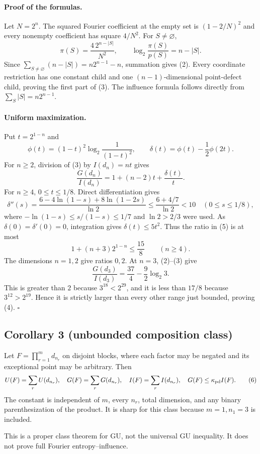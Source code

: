 \paragraph{Proof of the formulas.}
Let $N=2^n$.  The squared Fourier coefficient at the empty set is
$(1-2/N)^2$ and every nonempty coefficient has square $4/N^2$.  For
$S\ne\varnothing$,
\[
 \pi(S)=\frac{4\,2^{n-|S|}}{N^2},
 \qquad \log_2\frac{\pi(S)}{p(S)}=n-|S|.
\]
Since
$\sum_{S\ne\varnothing}(n-|S|)=n2^{n-1}-n$, summation gives (2).
Every coordinate restriction has one constant child and one
$(n-1)$-dimensional point-defect child, proving the first part of (3).
The influence formula follows directly from
$\sum_S|S|=n2^{n-1}$.

\paragraph{Uniform maximization.}
Put $t=2^{1-n}$ and
\[
 \phi(t)=(1-t)^2\log_2\frac1{(1-t)^2},\qquad
 \delta(t)=\phi(t)-\frac12\phi(2t).
\]
For $n\ge2$, division of (3) by $I(d_n)=nt$ gives
\[
 \frac{G(d_n)}{I(d_n)}
 =1+(n-2)t+\frac{\delta(t)}t.
\tag{5}
\]
For $n\ge4$, $0\le t\le1/8$.  Direct differentiation gives
\[
 \delta''(s)=\frac{6-4\ln(1-s)+8\ln(1-2s)}{\ln2}
 \le\frac{6+4/7}{\ln2}<10
 \quad(0\le s\le1/8),
\]
where $-\ln(1-s)\le s/(1-s)\le1/7$ and $\ln2>2/3$ were used.
As $\delta(0)=\delta'(0)=0$, integration gives $\delta(t)\le5t^2$.
Thus the ratio in (5) is at most
\[
 1+(n+3)2^{1-n}\le\frac{15}{8}\qquad(n\ge4).
\]
The dimensions $n=1,2$ give ratios $0,2$.  At $n=3$, (2)--(3) give
\[
 \frac{G(d_3)}{I(d_3)}=\frac{37}{4}-\frac92\log_2 3.
\]
This is greater than $2$ because $3^{18}<2^{29}$, and it is less than
$17/8$ because $3^{12}>2^{19}$.  Hence it is strictly larger than every
other range just bounded, proving (4). \(\square\)

\subsection*{Corollary 3 (unbounded composition class)}

Let $F=\prod_{r=1}^m d_{n_r}$ on disjoint blocks, where each factor may be
negated and its exceptional point may be arbitrary.  Then
\[
 U(F)=\sum_rU(d_{n_r}),\quad G(F)=\sum_rG(d_{n_r}),\quad
 I(F)=\sum_rI(d_{n_r}),\quad G(F)\le\kappa_{\rm pd}I(F).
\tag{6}
\]
The constant is independent of $m$, every $n_r$, total dimension, and any
binary parenthesization of the product.  It is sharp for this class because
$m=1,n_1=3$ is included.

This is a proper class theorem for GU, not the universal GU inequality.
It does not prove full Fourier entropy--influence.
